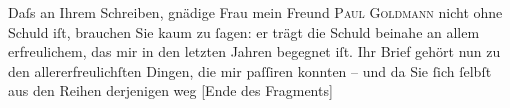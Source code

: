\pstart
           {\pb}Daſs an Ihrem Schreiben, gnädige Frau mein Freund \textsc{Paul Goldmann} nicht ohne Schuld iſt, brauchen Sie kaum zu{ }ſagen: er trägt die Schuld beinahe
               an allem erfreulichem, das mir in den letzten Jahren begegnet iſt. Ihr Brief gehört
               nun zu den allererfreulichſten Dingen, die mir paſſiren konnten – und da Sie{ }ſich{ }ſelbſt aus den Reihen derjenigen weg {[}Ende des Fragments{]}\pend
           \endnumbering{}  \newcommand{\dateiname}{L00337}\newcommand{\titel}{Arthur Schnitzler an Lou Andreas-Salomé, 13. 6. 1894}\newcommand{\editorInnen}{Martin Anton Müller und Gerd-Hermann Susen}

